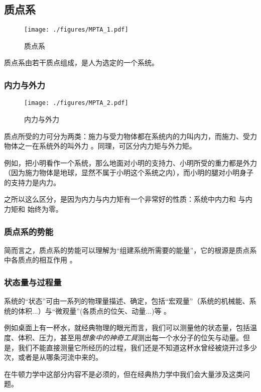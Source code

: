 
\subsection{质点系}
\begin{figure}[ht]
\centering
\texttt{[image: ./figures/MPTA\_1.pdf]}
\caption{质点系} \label{MPTA_fig1}
\end{figure}
质点系由若干质点组成，是人为选定的一个系统。

\subsubsection{内力与外力}
\begin{figure}[ht]
\centering
\texttt{[image: ./figures/MPTA\_2.pdf]}
\caption{内力与外力} \label{MPTA_fig2}
\end{figure}
质点所受的力可分为两类：施力与受力物体都在系统内的力叫内力，而施力、受力物体之一在系统外的叫外力 。同理，可区分内力矩与外力矩。

例如，把小明看作一个系统，那么地面对小明的支持力、小明所受的重力都是外力（因为施力物体是地球，显然不属于小明这个系统之内），而小明的腿对小明身子的支持力是内力。

之所以这么区分，是因为内力与内力矩有一个非常好的性质：系统中内力和 与内力矩和 始终为零。

\subsubsection{质点系的势能}
简而言之，质点系的势能可以理解为“组建系统所需要的能量”，它的根源是质点系中各质点的相互作用 。

\subsubsection{状态量与过程量}
系统的“状态”可由一系列的物理量描述、确定，包括“宏观量”（系统的机械能、系统的体积...）与“微观量”(各质点的位矢、动量...)等 。

例如桌面上有一杯水，就经典物理的眼光而言，我们可以测量他的状态量，包括温度、体积、压力，甚至用\textsl{想象中的神奇工具}测出每一个水分子的位矢与动量。但是，我们不能直接测量它所经历的过程，我们还是不知道这杯水曾经被烧开过多少次，或者是从哪条河流中来的。

在牛顿力学中这部分内容不是必须的，但在经典热力学中我们会大量涉及这类问题。

